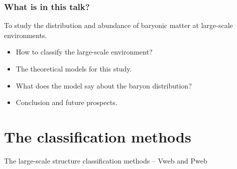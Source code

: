 \documentclass[aspectratio=43]{beamer}
\begin{document}
\begin{frame}
  \frametitle{What is in this talk?}
  To study the distribution and abundance of baryonic matter at large-scale environments.
  \begin{itemize}
    \item<1-> How to classify the large-scale environment?
    \item<2-> The theoretical models for this study.
    \item<3-> What does the model say about the baryon distribution?
    \item<4-> Conclusion and future prospects.
  \end{itemize}
\end{frame}

\section{The classification methods}
\begin{frame}{The large-scale structure classification methods -- Vweb and Pweb}

\end{frame}
\end{document}
